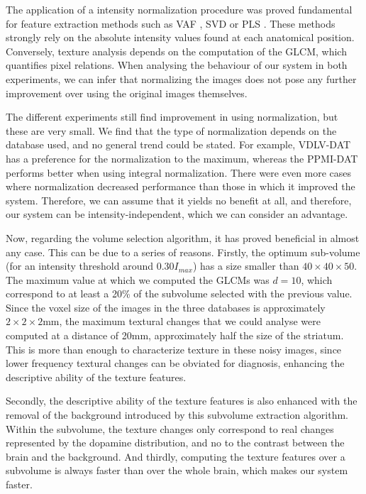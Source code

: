 The application of a intensity normalization procedure was proved fundamental for feature extraction methods such as \ac{VAF} \cite{Illan2012}, \ac{SVD} \cite{Segovia2012} or \ac{PLS} \cite{Rojas2012}. These methods strongly rely on the absolute intensity values found at each anatomical position. Conversely, texture analysis depends on the computation of the \ac{GLCM}, which quantifies pixel relations. When analysing the behaviour of our system in both experiments, we can infer that normalizing the images does not pose any further improvement over using the original images themselves. 

The different experiments still find improvement in using normalization, but these are very small. We find that the type of normalization depends on the database used, and no general trend could be stated. For example, VDLV-DAT has a preference for the normalization to the maximum, whereas the PPMI-DAT performs better when using integral normalization. There were even more cases where normalization decreased performance than those in which it improved the system. Therefore, we can assume that it yields no benefit at all, and therefore, our system can be intensity-independent, which we can consider an advantage. 

Now, regarding the volume selection algorithm, it has proved beneficial in almost any case. This can be due to a series of reasons. Firstly, the optimum sub-volume (for an intensity threshold around $0.30 I_{max}$) has a size smaller than $40\times40\times50$. The maximum value at which we computed the \acp{GLCM} was $d=10$, which correspond to at least a 20\% of the subvolume selected with the previous value. Since the voxel size of the images in the three databases is approximately $2\times2\times2$mm, the maximum textural changes that we could analyse were computed at a distance of 20mm, approximately half the size of the striatum. This is more than enough to characterize texture in these noisy images, since lower frequency textural changes can be obviated for diagnosis, enhancing the descriptive ability of the texture features. 

Secondly, the descriptive ability of the texture features is also enhanced with the removal of the background introduced by this subvolume extraction algorithm. Within the subvolume, the texture changes only correspond to real changes represented by the dopamine distribution, and no to the contrast between the brain and the background. And thirdly, computing the texture features over a subvolume is always faster than over the whole brain, which makes our system faster. 

